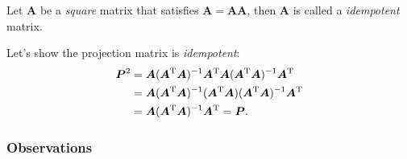 \begin{definition}[Idempotent]
Let $\bm A$ be a \emph{square} matrix that satisfies $\bm A=\bm A\bm A$, then $\bm A$ is called a \emph{idempotent} matrix.
\end{definition}
Let's show the projection matrix is \textit{idempotent}:\\
\[
\begin{aligned}
\bm P^{2}&=\bm A(\bm A^{\mathrm T}\bm A)^{-1}\bm A^{\mathrm T}\bm A(\bm A^{\mathrm T}\bm A)^{-1}\bm A^{\mathrm T}\\
&=\bm A(\bm A^{\mathrm T}\bm A)^{-1}(\bm A^{\mathrm T}\bm A)(\bm A^{\mathrm T}\bm A)^{-1}\bm A^{\mathrm T}\\
&=\bm A(\bm A^{\mathrm T}\bm A)^{-1}\bm A^{\mathrm T}=\bm P.
\end{aligned}
\]
\subsubsection{Observations}
